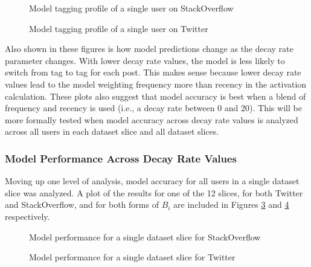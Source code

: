 \documentclass[man,floatsintext,donotrepeattitle]{apa6}
\begin{document}
\begin{figure}[!htbp]
  \caption{Model tagging profile of a single user on StackOverflow}
  \label{figPriorHTMByTimeSO}
\end{figure}

\begin{figure}[!htbp]
  \caption{Model tagging profile of a single user on Twitter}
  \label{figPriorHTMByTimeT}
\end{figure}

Also shown in these figures is how model predictions change as the decay rate parameter changes.
With lower decay rate values, the model is less likely to switch from tag to tag for each post.
This makes sense because lower decay rate values lead to the model weighting frequency more than recency in the activation calculation.
These plots also suggest that model accuracy is best when a blend of frequency and recency is used (i.e., a decay rate between 0 and 20).
This will be more formally tested when model accuracy across decay rate values is analyzed across all users in each dataset slice and all dataset slices.

\subsubsection{Model Performance Across Decay Rate Values}

Moving up one level of analysis, model accuracy for all users in a single dataset slice was analyzed.
A plot of the results for one of the 12 slices, for both Twitter and StackOverflow, and for both forms of $B_{i}$ are included in Figures \ref{figPriorSOQSliceDsStd} and \ref{figPriorTwitterSliceDsStd} respectively.

\begin{figure}[!htbp]
  {%
    \setlength{\fboxsep}{0pt}%
    \setlength{\fboxrule}{1pt}%
    \hfill
    \hfill
    \caption{Model performance for a single dataset slice for StackOverflow}
    \label{figPriorSOQSliceDsStd}
  }%
\end{figure}

\begin{figure}[!htbp]
  {%
    \setlength{\fboxsep}{0pt}%
    \setlength{\fboxrule}{1pt}%
    \hfill
    \hfill
    \caption{Model performance for a single dataset slice for Twitter}
    \label{figPriorTwitterSliceDsStd}
  }%
\end{figure}
\end{document}
